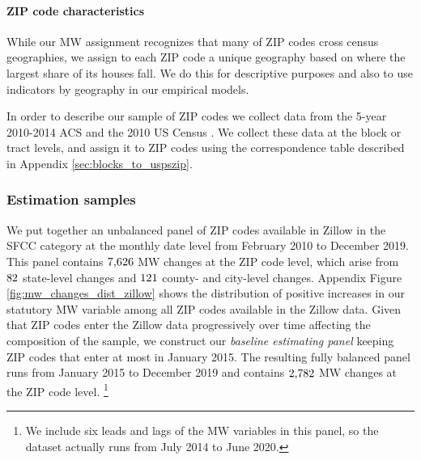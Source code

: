 %
%

\paragraph{ZIP code characteristics}

While our MW assignment recognizes that many of ZIP codes cross census 
geographies, we assign to each ZIP code a unique geography based on where the 
largest share of its houses fall.
We do this for descriptive purposes and also to use indicators by geography 
in our empirical models.

In order to describe our sample of ZIP codes we collect data from 
the 5-year 2010-2014 ACS \parencite{CensusACS} and
the 2010 US Census \parencite{CensusDecennial}.
We collect these data at the block or tract levels, and assign it to ZIP codes
using the correspondence table described in Appendix \ref{sec:blocks_to_uspszip}.

\subsubsection{Estimation samples}\label{sec:data_final_panel}

We put together an unbalanced panel of ZIP codes available in Zillow in the SFCC 
category at the monthly date level from February 2010 to December 2019.
This panel contains $\textnormal{7,626}$ MW changes at the ZIP code level, 
which arise from $\textnormal{82}$ state-level changes and 
$\textnormal{121}$ county- and city-level changes.
Appendix Figure \ref{fig:mw_changes_dist_zillow} shows the distribution of 
positive increases in our statutory MW variable among all ZIP codes available 
in the Zillow data.
Given that ZIP codes enter the Zillow data progressively over time affecting 
the composition of the sample,
we construct our \textit{baseline estimating panel} keeping ZIP codes that enter 
at most in January 2015.
The resulting fully balanced panel runs from January 2015 to December 2019
and contains $\textnormal{2,782}$ MW changes at the ZIP code level.%
\footnote{We include six leads and lags of the MW variables in this panel,
so the dataset actually runs from July 2014 to June 2020.}

